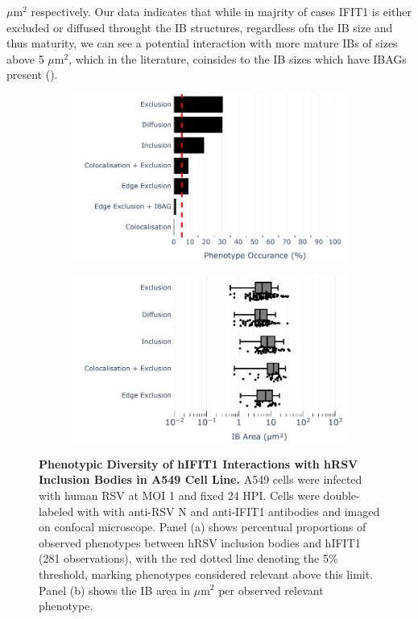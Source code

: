 \(\mu \mbox{m}^2\) respectively. Our data indicates that while in majrity of cases IFIT1 is either excluded or diffused throught the IB structures, regardless ofn the IB size and thus maturity, we can see a potential interaction with more mature IBs of sizes above 5 \(\mu \mbox{m}^2\), which in the literature, coinsides to the IB sizes which have IBAGs present (\cite{Rincheval2017FunctionalVirus}). 

\begin{figure}
    \begin{subfigure}{0.495\textwidth}
        \caption{}
        \includegraphics[width=1\linewidth]{08. Chapter 3/Figs/02. Infection/01. IFIT1/01. bar_i1_a549.pdf} 
    \end{subfigure}
    \begin{subfigure}{0.495\textwidth}
        \caption{}
        \includegraphics[width=1\linewidth]{08. Chapter 3/Figs/02. Infection/01. IFIT1/02. box_i1_a549.pdf}
    \end{subfigure}
    \caption[Phenotypic Diversity of hIFIT1 Interactions with hRSV Inclusion Bodies in A549 Cell Line.]{\textbf{Phenotypic Diversity of hIFIT1 Interactions with hRSV Inclusion Bodies in A549 Cell Line.} A549 cells were infected with human RSV at MOI 1 and fixed 24 HPI. Cells were double-labeled with with anti-RSV N and anti-IFIT1 antibodies and imaged on confocal microscope. Panel (a) shows percentual proportions of observed phenotypes between hRSV inclusion bodies and hIFIT1 (281 observations), with the red dotted line denoting the 5\% threshold, marking phenotypes considered relevant above this limit. Panel (b) shows the IB area in \(\mu \mbox{m}^2\) per observed relevant phenotype.}

\end{figure}
